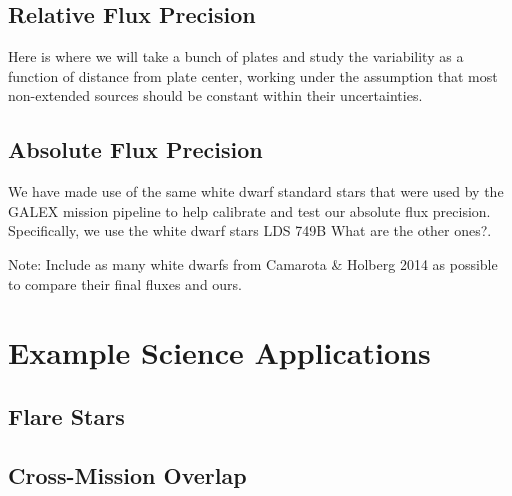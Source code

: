 \documentclass[preprint]{aastex}
\begin{document}
\subsection{Relative Flux Precision}
{\color{red}Here is where we will take a bunch of plates and study the variability as a function of distance from plate center, working under the assumption that most non-extended sources should be constant within their uncertainties.}

\subsection{Absolute Flux Precision}
We have made use of the same white dwarf standard stars that were used by the GALEX mission pipeline to help calibrate and test our absolute flux precision.  Specifically, we use the white dwarf stars LDS 749B {\color{red}What are the other ones?}.

{\color{red}Note: Include as many white dwarfs from Camarota \& Holberg 2014 as possible to compare their final fluxes and ours.}

\section{Example Science Applications}
\label{scienceexamples}

\subsection{Flare Stars}

\subsection{Cross-Mission Overlap}
\end{document}
